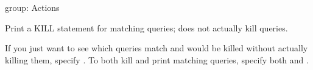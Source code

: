 \documentclass[letterpaper,10pt,english]{sphinxmanual}
\begin{document}

\begin{fulllineitems}
\label{\detokenize{mariadb-kill:cmdoption-mariadb-kill-print}}
group: Actions

Print a KILL statement for matching queries; does not actually kill queries.

If you just want to see which queries match and would be killed without
actually killing them, specify {\hyperref[\detokenize{mariadb-kill:cmdoption-mariadb-kill-print}]{}}.  To both kill and print
matching queries, specify both {\hyperref[\detokenize{mariadb-kill:cmdoption-mariadb-kill-kill}]{}} and {\hyperref[\detokenize{mariadb-kill:cmdoption-mariadb-kill-print}]{}}.

\end{fulllineitems}
\end{document}

